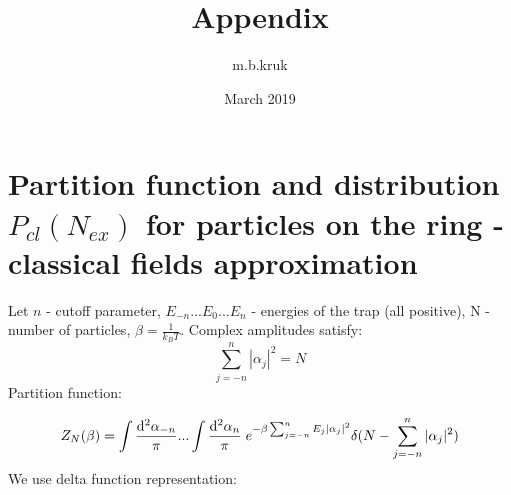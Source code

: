 \documentclass{article}
\title{Appendix}
\author{m.b.kruk }
\date{March 2019}
\begin{document}
\def\Res{\qopname\relax m{Res}}
\maketitle

\section{Partition function and distribution $P_{cl}(N_{ex})$ for particles on the ring - classical fields approximation}
Let $n$ - cutoff parameter, $E_{-n}...E_0...E_n$ - energies of the trap (all positive), N - number of particles, $\beta=\frac{1}{k_B T}$. Complex amplitudes satisfy:
\begin{equation*}
\sum_{j=-n}^n  |\alpha_j|^2=N
\end{equation*}
Partition function:

\begin{equation*}
Z_N(\beta)=\int \frac{\mathrm{d}^2 \alpha_{-n}}{\pi}... \int \frac{\mathrm{d}^2 \alpha_n}{\pi}  \; e^{- \beta \sum\displaylimits_{j=-n}^n E_j |\alpha_j|^2} \delta (N-\sum_{j=-n}^n  |\alpha_j|^2)
\end{equation*}
We use delta function representation:
\end{document}
